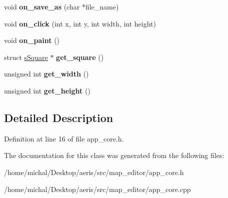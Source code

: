 \begin{DoxyCompactItemize}
\item 
\hypertarget{classCAppCore_afe555240f879f62da546cc684213b298}{void {\bfseries on\-\_\-save\-\_\-as} (char $\ast$file\-\_\-name)}\label{classCAppCore_afe555240f879f62da546cc684213b298}

\item 
\hypertarget{classCAppCore_a860881dd71c550d236b271558a071b6f}{void {\bfseries on\-\_\-click} (int x, int y, int width, int height)}\label{classCAppCore_a860881dd71c550d236b271558a071b6f}

\item 
\hypertarget{classCAppCore_a5081d0908fdee65af5b3c54b19ccc993}{void {\bfseries on\-\_\-paint} ()}\label{classCAppCore_a5081d0908fdee65af5b3c54b19ccc993}

\item 
\hypertarget{classCAppCore_a91b9cfdf8794989b89d11326a670d8b6}{struct \hyperlink{structsSquare}{s\-Square} $\ast$ {\bfseries get\-\_\-square} ()}\label{classCAppCore_a91b9cfdf8794989b89d11326a670d8b6}

\item 
\hypertarget{classCAppCore_abd50d06be6f9361f7e4560a8b73a88cb}{unsigned int {\bfseries get\-\_\-width} ()}\label{classCAppCore_abd50d06be6f9361f7e4560a8b73a88cb}

\item 
\hypertarget{classCAppCore_a5e21b617f5b3ad55cdca457c63549643}{unsigned int {\bfseries get\-\_\-height} ()}\label{classCAppCore_a5e21b617f5b3ad55cdca457c63549643}

\end{DoxyCompactItemize}


\subsection{Detailed Description}


Definition at line 16 of file app\-\_\-core.\-h.



The documentation for this class was generated from the following files\-:\begin{DoxyCompactItemize}
\item 
/home/michal/\-Desktop/aeris/src/map\-\_\-editor/app\-\_\-core.\-h\item 
/home/michal/\-Desktop/aeris/src/map\-\_\-editor/app\-\_\-core.\-cpp\end{DoxyCompactItemize}
